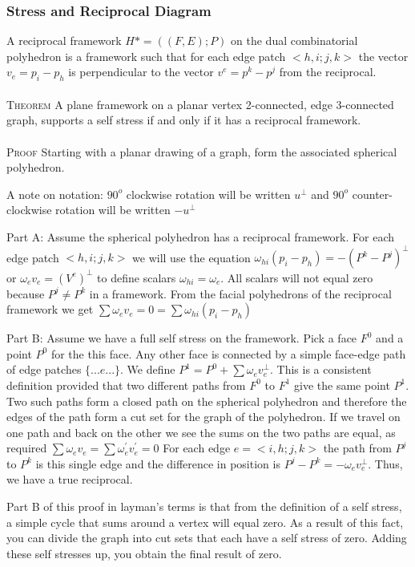 \documentclass[english]{article}
\begin{document}
\subsubsection{Stress and Reciprocal Diagram}
A reciprocal framework $H* = ((F,E);P)$ on the dual combinatorial polyhedron is a framework such that for each edge patch $<h,i;j,k>$  the vector $v_e = p_i - p_h$ is perpendicular to the vector $v^e = p^k - p^j$ from the reciprocal. \\
\\
\textsc{Theorem} A plane framework on a planar vertex 2-connected, edge 3-connected graph, supports a self stress if and only if it has a reciprocal framework. \\
\\
\textsc{Proof} Starting with a planar drawing of a graph, form the associated spherical polyhedron. 

A note on notation: $90^o$ clockwise rotation will be written $u^\bot$ and $90^o$ counter-clockwise rotation will be written $-u^\bot$

Part A: Assume the spherical polyhedron has a reciprocal framework.
For each edge patch $<h,i;j,k>$ we will use the equation $\omega_{hi}(p_i - p_h) = -(P^k - P^j)^\bot$ or $\omega_ev_e = (V^e)^\bot$ to define scalars $\omega_{hi} = \omega_e$. All scalars will not equal zero because $P^j \neq P^k$ in a framework. From the facial polyhedrons of the reciprocal framework we get $\sum\omega_ev_e = 0 = \sum\omega_{hi}(p_i - p_h)$

Part B: Assume we have a full self stress on the framework.
Pick a face $F^0$ and a point $P^0$ for the this face. Any other face is connected by a simple face-edge path of edge patches $\{...e...\}$. We define $P^1 = P^0 + \sum\omega_ev_e^\bot$. This is a consistent definition provided that two different paths from $F^0$ to $F^1$ give the same point $P^1$. Two such paths form a closed path on the spherical polyhedron and therefore the edges of the path form a cut set for the graph of the polyhedron. If we travel on one path and back on the other we see the sums on the two paths are equal, as required $\sum\omega_ev_e = \sum\omega_e^{'}v_e^{'} = 0$ For each edge $e = <i,h;j,k>$ the path from $P^j$ to $P^k$ is this single edge and the difference in position is $P^j - P^k = -\omega_ev_e^\bot$. Thus, we have a true reciprocal.

Part B of this proof in layman's terms is that from the definition of a self stress, a simple cycle that sums around a vertex will equal zero. As a result of this fact, you can divide the graph into cut sets that each have a self stress of zero. Adding these self stresses up, you obtain the final result of zero.
\end{document}
